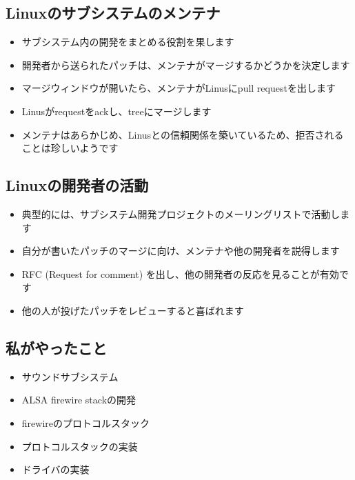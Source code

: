 \documentclass[mingoth,a4paper]{jsarticle}
\begin{document}
\subsection{Linuxのサブシステムのメンテナ}

\begin{itemize}
\itemsep1pt\parskip0pt
\item
  サブシステム内の開発をまとめる役割を果します
\item
  開発者から送られたパッチは、メンテナがマージするかどうかを決定します
\item
  マージウィンドウが開いたら、メンテナがLinusにpull requestを出します
\item
  Linusがrequestをackし、treeにマージします
\item
  メンテナはあらかじめ、Linusとの信頼関係を築いているため、拒否されることは珍しいようです
\end{itemize}

\subsection{Linuxの開発者の活動}

\begin{itemize}
\itemsep1pt\parskip0pt
\item
  典型的には、サブシステム開発プロジェクトのメーリングリストで活動します
\item
  自分が書いたパッチのマージに向け、メンテナや他の開発者を説得します
\item
  RFC (Request for comment) を出し、他の開発者の反応を見ることが有効です
\item
  他の人が投げたパッチをレビューすると喜ばれます
\end{itemize}

\subsection{私がやったこと}
\begin{multicols}{2}
\begin{itemize}
\itemsep1pt\parskip0pt
\item
  サウンドサブシステム
\item
  ALSA firewire stackの開発
\item
  firewireのプロトコルスタック
\item
  プロトコルスタックの実装
\item
  ドライバの実装
\end{itemize}
\end{multicols}
\end{document}
